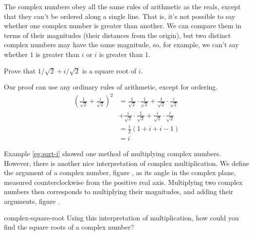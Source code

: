 The complex numbers obey all the same rules of arithmetic as the reals, except that
they can't be ordered along a single line. That is, it's not possible to say whether
one complex number is greater than another. We can compare them in terms of their
magnitudes
(their distances from the origin), but two distinct complex numbers may
have the same magnitude, so, for example, we can't say whether $1$ is greater than
$i$ or $i$ is greater than $1$.

\begin{eg}\label{eg:sqrt-i}
\egquestion Prove that $1/\sqrt{2}+i/\sqrt{2}$ is a square root of $i$.

\eganswer Our proof can use any ordinary rules of arithmetic, except for
ordering.
\begin{align*}
   (\frac{1}{\sqrt{2}}+\frac{i}{\sqrt{2}})^2 
    & = \frac{1}{\sqrt{2}}\cdot\frac{1}{\sqrt{2}}
       +\frac{1}{\sqrt{2}}\cdot\frac{i}{\sqrt{2}}\\
       &+\frac{i}{\sqrt{2}}\cdot\frac{1}{\sqrt{2}}
       +\frac{i}{\sqrt{2}}\cdot\frac{i}{\sqrt{2}} \\
    &= \frac{1}{2}(1+i+i-1) \\
    &= i
\end{align*}
\end{eg}

Example \ref{eg:sqrt-i} showed one method of multiplying complex numbers.
However, there is another nice interpretation of complex multiplication.
We define the argument of a complex number, figure , as its angle in the complex plane, measured
counterclockwise from the positive real axis.
Multiplying two complex numbers then corresponds to multiplying their magnitudes,
and adding their arguments, figure .
%
%

\begin{selfcheck}{complex-square-root}
Using this interpretation of multiplication, how could you find the
square roots of a complex number?
\end{selfcheck}

